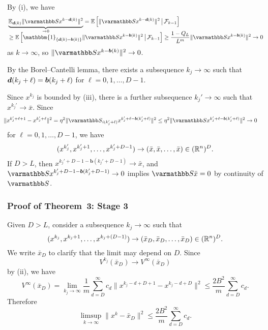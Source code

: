 \documentclass[10pt,mathserif]{beamer}
\begin{document}
\begin{frame}[plain]
By (i), we have
\begin{align*}
&\underbrace{
\EE_{\vecdelay(k)}\|\opS x^{k-\vecdelay(k)}\|^2}_{\rightarrow 0}
=
\EE\left[\|\opS x^{k-\vecdelay(k)}\|^2\,\big|\,\mathcal{F}_{k-1}\right]\\[-0.1in]
&\ge
\EE\left[
\mathbbm{1}_{\{\vecdelay(k)=\boldsymbol{b}(k)\}}\|\opS x^{k-\boldsymbol{b}(k)}\|^2\,\big|\,\mathcal{F}_{k-1}\right]
\ge\frac{1-Q_L}{L^m}\|\opS x^{k-\boldsymbol{b}(k)}\|^2\rightarrow 0
\end{align*}
as $k\rightarrow\infty$, so $\|\opS x^{k-\boldsymbol{b}(k)}\|^2\rightarrow 0$.

\vspace{0.1in}
By the Borel--Cantelli lemma, there exists a subsequence $k_j\rightarrow\infty$ such that 
$\boldsymbol{d}(k_j+\ell)=\boldsymbol{b}(k_j+\ell)$ for $\ell=0,1,\dots,D-1$.


\vspace{0.1in}
Since $x^{k_j}$ is bounded by (iii), there is a further subsequence $k_j'\rightarrow\infty$ such that $x^{k_j'}\rightarrow \bar{x}$. 
Since
\begin{align*}
\!\!\!\!
\|x^{k_j'+\ell+1}-x^{k_j'+\ell}\|^2&=\eta^2\|\opS_{i(k_j'+\ell)} x^{k_j'+\ell-{\boldsymbol{b}}(k_j'+\ell)}\|^2
\le \eta^2\|\opS x^{k_j'+\ell-{\boldsymbol{b}}(k_j'+\ell)}\|^2\rightarrow 0
\end{align*}
for $\ell=0,1,\dots,D-1$, we have
\[
(x^{k_j'},x^{k_j'+1},\dots,x^{k_j'+D-1})
\rightarrow (\bar{x},\bar{x},\dots,\bar{x})\in (\mathbb{R}^n)^{D}.
\]
If $D>L$, then $x^{k_j'+D-1-\boldsymbol{b}(k_j'+D-1)}\rightarrow \bar{x}$, 
and $\opS x^{k_j'+D-1-\boldsymbol{b}(k_j'+D-1)}\rightarrow 0$ implies $\opS \bar{x}=0$ by continuity of $\opS$.

\end{frame}






\begin{frame}
\frametitle{Proof of Theorem~3: Stage 3} 
Given $D> L$, consider a subsequence $k_j\rightarrow\infty$ such that 
\[
(x^{k_j},x^{k_j+1},\dots,x^{k_j+(D-1)})\rightarrow (\bar{x}_D,\bar{x}_D,\dots,\bar{x}_D)\in (\mathbb{R}^n)^D.
\]
We write $\bar{x}_D$ to clarify that the limit may depend on  $D$.
Since
\[
V^{k_j}(\bar{x}_D)\rightarrow V^{\infty}(\bar{x}_D)
\]
by (ii), we have
\[
V^{\infty}(\bar{x}_D)=
\lim_{k_j\rightarrow\infty}\frac{1}{m}\sum^\infty_{d=D}c_d \|x^{k_j-d+D+1}-x^{k_j-d+D}\|^2
\le 
\frac{2B^2}{m}\sum^\infty_{d=D}c_d .
\]
Therefore 
\begin{equation}
\limsup_{k\rightarrow\infty}\|x^k-\bar{x}_D\|^2\le
\frac{2B^2}{m}\sum^\infty_{d=D}c_d .
\label{eq:async-limit}
\end{equation}
\end{frame}
\end{document}
